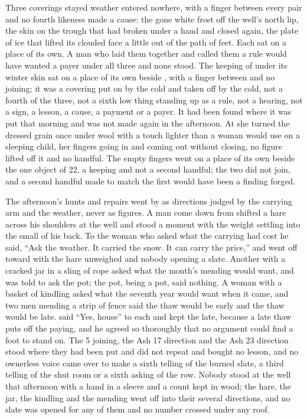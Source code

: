 Three coverings stayed weather entered nowhere, with a finger between every pair and no fourth likeness made a cause: the gone white frost off the well's north lip, the skin on the trough that had broken under a hand and closed again, the plate of ice that lifted its clouded face a little out of the path of feet. Each sat on a place of its own. A man who laid them together and called them a rule would have wanted a payer under all three and none stood. The keeping of  under its winter skin sat on a place of its own beside , with a finger between and no joining; it was a covering put on by the cold and taken off by the cold, not a fourth of the three, not a sixth low thing standing up as a rule, not a hearing, not a sign, a lesson, a cause, a payment or a payer. It had been found where it was put that morning and was not made again in the afternoon. At  she turned the dressed grain once under wool with a touch lighter than a woman would use on a sleeping child, her fingers going in and coming out without closing, no figure lifted off it and no handful. The empty fingers went on a place of its own beside the one object of  22, a keeping and not a second handful; the two did not join, and a second handful made to match the first would have been a finding forged.

\scenebreak

The afternoon's hunts and repairs went by as directions judged by the carrying arm and the weather, never as figures. A man come down from  shifted a hare across his shoulders at the well and stood a moment with the weight settling into the small of his back. To the woman who asked what the carrying had cost he said, “Ask the weather. It carried the snow. It can carry the price,” and went off toward  with the hare unweighed and nobody opening a slate. Another with a cracked jar in a sling of rope asked what the month's mending would want, and was told to ask the pot; the pot, being a pot, said nothing. A woman with a basket of kindling asked what the seventh year would want when it came, and two men mending a strip of fence said the thaw would be early and the thaw would be late.  said “Yes, house” to each and kept the late, because a late thaw puts off the paying, and he agreed so thoroughly that no argument could find a foot to stand on. The  5 joining, the Ash 17 direction and the Ash 23 direction stood where they had been put and did not repeat and bought no lesson, and no ownerless voice came over  to make a sixth telling of the burned slate, a third telling of the shut room or a sixth asking of the row. Nobody stood at the well that afternoon with a hand in a sleeve and a count kept in wood; the hare, the jar, the kindling and the mending went off into their several directions, and no slate was opened for any of them and no number crossed under any roof.

